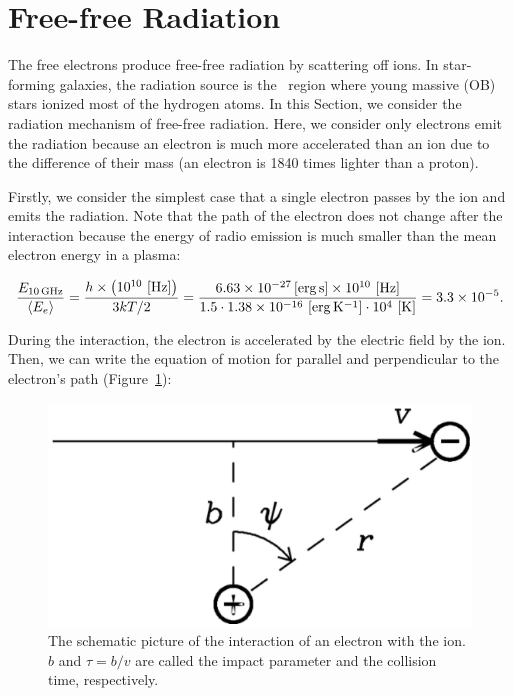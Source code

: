 \section{Free-free Radiation}\label{sec:freefreeradiation}

The free electrons produce free-free radiation by scattering off ions.
In star-forming galaxies, the radiation source is the \ih~region where young massive (OB) stars ionized most of the hydrogen atoms.
In this Section, we consider the radiation mechanism of free-free radiation.
Here, we consider only electrons emit the radiation because an electron is much more accelerated than an ion due to the difference of their mass (an electron is 1840 times lighter than a proton).

Firstly, we consider the simplest case that a single electron passes by the ion and emits the radiation.
Note that the path of the electron does not change after the interaction because the energy of radio emission is much smaller than the mean electron energy in a plasma:

\begin{equation}\label{eq:essential_radio4n12}
    \frac{E_{\mathrm{10\,\mathrm{GHz}}}}{\left\langle E_e\right\rangle} = \frac{h \times \left(10^{10}\,\left[\mathrm{Hz}\right]\right)}{3kT / 2} = \frac{6.63 \times 10^{-27} \left[\mathrm{erg\,s}\right] \times 10^{10}\,\left[\mathrm{Hz}\right]}{1.5 \cdot 1.38 \times 10^{-16}\,\left[\mathrm{erg\,K^{-1}}\right] \cdot 10^4\,\left[\mathrm{K}\right]} = 3.3 \times 10^{-5}.
\end{equation}

During the interaction, the electron is accelerated by the electric field by the ion.
Then, we can write the equation of motion for parallel and perpendicular to the electron's path (Figure~\ref{fig:nrao_radio4n2}):

\begin{figure}[htbp]
	\centering
	\includegraphics[width=.6\linewidth]{Chapter_2/Figures/NRAO_radio4n2.png}
    \caption[The schematic image of the interaction of an electron with the ion]{\label{fig:nrao_radio4n2}
        The schematic picture of the interaction of an electron with the ion.
        $b$ and $\tau = b/v$ are called the impact parameter and the collision time, respectively.
    }
\end{figure}

